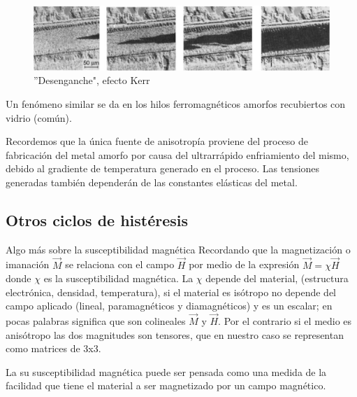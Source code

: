 \begin{figure}[H]
    \centering
    \includegraphics[width=1.0\textwidth]{./Figures/fig313}
	\caption{''Desenganche", efecto Kerr}
	\label{fig:313}
\end{figure}


Un fenómeno similar se da en los hilos ferromagnéticos amorfos recubiertos con vidrio (común).

Recordemos que la única fuente de anisotropía proviene del proceso de fabricación del metal amorfo por
causa del ultrarrápido enfriamiento del mismo, debido al gradiente de temperatura generado en el proceso. Las tensiones generadas también dependerán de las constantes elásticas del metal.

\subsection{Otros ciclos de histéresis}

Algo más sobre la susceptibilidad magnética Recordando que la magnetización o imanación $\overrightarrow{M}$ se relaciona con el campo $\overrightarrow{H}$ por medio de la expresión ${\overrightarrow{M}= \chi \overrightarrow{H}}$ donde $\chi$ es la susceptibilidad magnética. La $\chi$
depende del material, (estructura electrónica, densidad, temperatura), si el material es isótropo no depende del campo aplicado (lineal, paramagnéticos y diamagnéticos) y es un escalar; en pocas palabras significa que son colineales $\overrightarrow{M}$ y $\overrightarrow{H}$. Por el contrario si el medio es anisótropo las dos magnitudes son tensores, que en nuestro caso se representan como matrices de 3x3.

La su susceptibilidad magnética puede ser pensada como una medida de la facilidad que tiene el material a ser magnetizado por un campo magnético.


